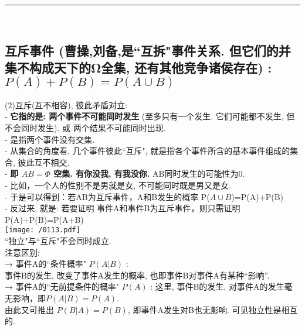 \documentclass[UTF8]{ctexart}
\begin{document}
	
	
	~\\
	\hrule
	~\\
	
	
	\subsection{互斥事件 (曹操,刘备,是``互拆"事件关系. 但它们的并集不构成天下的Ω全集, 还有其他竞争诸侯存在) : $P(A)+P(B)=P(A \cup B)$}
	
	(2)互斥(互不相容), 彼此矛盾对立: \\
	- \textbf{它指的是: 两个事件不可能同时发生} (至多只有一个发生. 它们可能都不发生, 但不会同时发生). 或 两个结果不可能同时出现. \\
	-  是指两个事件没有交集. \\
	- 从集合的角度看, 几个事件彼此``互斥", 就是指各个事件所含的基本事件组成的集合, 彼此互不相交. \\
	- \textbf{即 $ AB=\varPhi $ 空集.  有你没我, 有我没你.} AB同时发生的可能性为0. \\
	- 比如，一个人的性别不是男就是女, 不可能同时既是男又是女. \\
	
	- 于是可以得到：若AB为互斥事件，A和B发生的概率 P($A \cup B$)=P(A)+P(B) \\
	- 反过来, 就是: 若要证明 事件A和事件B为互斥事件，则只需证明 P(A)+P(B)=P(A+B) \\
	
	
	\texttt{[image: /0113.pdf]} \\
	
	
	``独立"与``互斥"不会同时成立. \\
	
	
	
	
	注意区别:	\\
	→ 事件A的``条件概率" $P(A|B)$ :  \\
	事件B的发生, 改变了事件A发生的概率, 也即事件B对事件A有某种``影响”. \\
	
	→ 事件A的``无前提条件的概率" $P(A)$ : 这里, 事件B的发生, 对事件A的发生毫无影响，即$ P(A|B)=P(A)$.  \\
	由此又可推出 $ P(B|A)=P(B)$, 即事件A发生对B也无影响. 可见独立性是相互的.  \\
	
\end{document}
